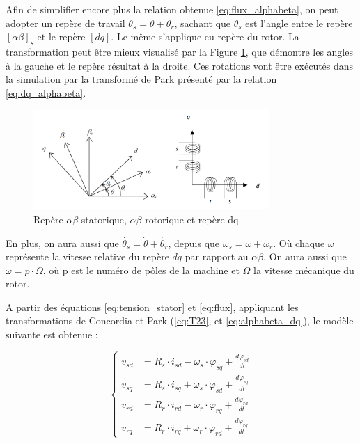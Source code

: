 Afin de simplifier encore plus la relation obtenue \ref{eq:flux_alphabeta}, on peut adopter un repère de travail $\theta_s = \theta + \theta_r$, sachant que $\theta_s$ est l'angle entre le repère $[\alpha\beta]_s$ et le repère $[dq]$. Le même s'applique eu repère du rotor. La transformation peut être mieux visualisé par la Figure \ref{img-repere}, que démontre les angles à la gauche et le repère résultat à la droite. Ces rotations vont être exécutés dans la simulation par la transformé de Park présenté par la relation \ref{eq:dq_alphabeta}.

\begin{figure}[!h]
    \centering
    \includegraphics[width=0.8\textwidth]{book_imgs/repere.png} 
    \caption{Repère $\alpha\beta$ statorique, $\alpha\beta$ rotorique et repère dq.}
    \label{img-repere}
\end{figure}

En plus, on aura aussi que $\dot{\theta_s} = \dot{\theta} + \dot{\theta_r}$, depuis que $\omega_s = \omega + \omega_r$. Où chaque $\omega$ représente la vitesse relative du repère $dq$ par rapport au $\alpha\beta$. On aura aussi que $\omega = p \cdot \Omega$, où p est le numéro de pôles de la machine et $\Omega$ la vitesse mécanique du rotor.

A partir des équations \ref{eq:tension_stator} et \ref{eq:flux}, appliquant les transformations de Concordia et Park (\ref{eq:T23}, et \ref{eq:alphabeta_dq}), le modèle suivante est obtenue :


\begin{equation}
    \left\{
    \begin{aligned}
    v_{sd} &= R_s \cdot i_{sd} - \omega_s \cdot \varphi_{sq} + \frac{d\varphi_{sd}}{dt} \\
    v_{sq} &= R_s \cdot i_{sq} + \omega_s \cdot \varphi_{sd} + \frac{d\varphi_{sq}}{dt} \\
    v_{rd} &= R_r \cdot i_{rd} - \omega_r \cdot \varphi_{rq} + \frac{d\varphi_{rd}}{dt} \\
    v_{rq} &= R_r \cdot i_{rq} + \omega_r \cdot \varphi_{rd} + \frac{d\varphi_{rq}}{dt}
    \end{aligned}
    \right.
    \label{eq:tensions_finales}
\end{equation}

